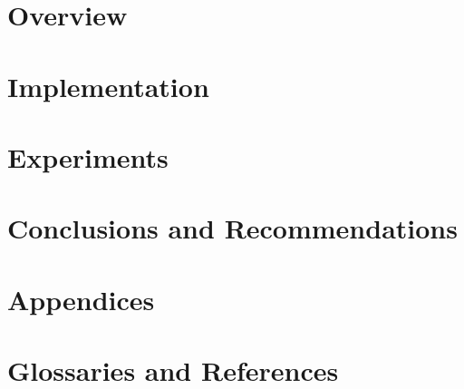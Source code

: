 \documentclass[\mytextsize, a4paper, twoside, openany]{memoir}
\begin{document}
\frontmatter


\mainmatter
\part{Overview}
\label{pt:overview}



\part{Implementation}
\label{pt:implementation}


\part{Experiments}
\label{pt:experiments}



\part{Conclusions and Recommendations}
\label{pt:results}


\part{Appendices}
\label{pt:appendices}


\part{Glossaries and References}
\label{pt:backmatter}
\backmatter

\end{document}
